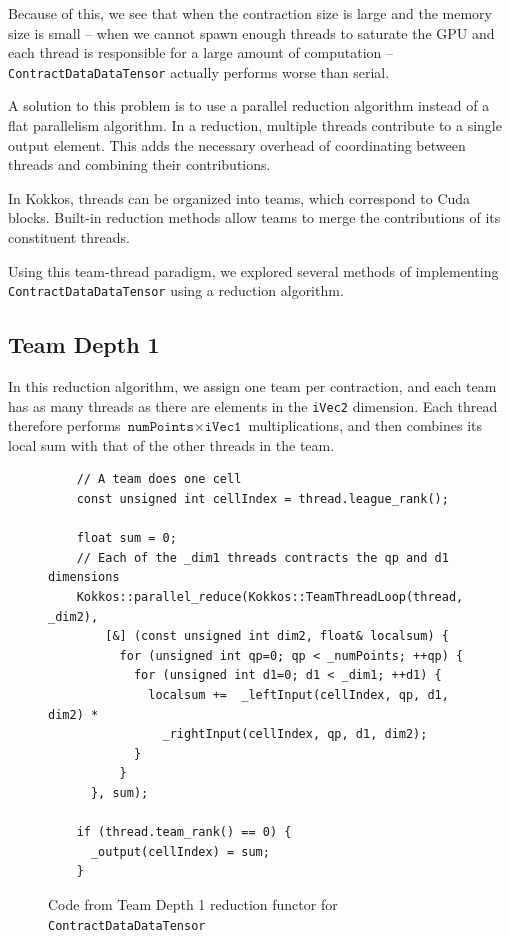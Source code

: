 Because of this, we see that when the contraction size is large and the memory size is
small -- when we cannot spawn enough threads to saturate the GPU and each thread
is responsible for a large amount of computation --
\texttt{ContractDataDataTensor} actually performs worse than serial.

A solution to this problem is to use a parallel reduction algorithm instead of a
flat parallelism algorithm.  In a reduction, multiple threads contribute to a
single output element.  This adds the necessary overhead of coordinating between
threads and combining their contributions.

In Kokkos, threads can be organized into teams, which correspond to Cuda blocks.
Built-in reduction methods allow teams to merge the contributions of its
constituent threads.

Using this team-thread paradigm, we explored several methods of implementing
\texttt{ContractDataDataTensor} using a reduction algorithm.

\subsection{Team Depth 1}
    In this reduction algorithm, we assign one team per contraction, and each
    team has as many threads as there are elements in the \texttt{iVec2}
    dimension.  Each thread therefore performs $\texttt{numPoints} \times
    \texttt{iVec1}$ multiplications, and then combines its local sum with that
    of the other threads in the team.


\begin{figure}[ht]
    \begin{lstlisting}
    // A team does one cell
    const unsigned int cellIndex = thread.league_rank();

    float sum = 0;
    // Each of the _dim1 threads contracts the qp and d1 dimensions
    Kokkos::parallel_reduce(Kokkos::TeamThreadLoop(thread, _dim2),
        [&] (const unsigned int dim2, float& localsum) {
          for (unsigned int qp=0; qp < _numPoints; ++qp) {
            for (unsigned int d1=0; d1 < _dim1; ++d1) {
              localsum +=  _leftInput(cellIndex, qp, d1, dim2) *
                _rightInput(cellIndex, qp, d1, dim2);
            }
          }
      }, sum);

    if (thread.team_rank() == 0) {
      _output(cellIndex) = sum;
    }
 \end{lstlisting}
\caption{Code from Team Depth 1 reduction functor for \texttt{ContractDataDataTensor}
\label{lst:ContractDataDataTensorDepth1Functor}} 
\end{figure}

